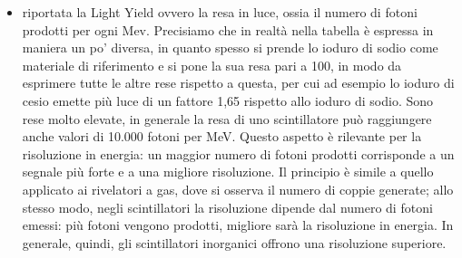 \begin{esempio}
\begin{itemize}[leftmargin=0.5cm]
      \item \E riportata la Light Yield ovvero la resa in luce, ossia il numero di fotoni prodotti per ogni Mev. Precisiamo che in realtà nella tabella è espressa in maniera un po' diversa, in quanto spesso si prende lo ioduro di sodio come materiale di riferimento e si pone la sua resa pari a 100, in modo da esprimere tutte le altre rese rispetto a questa, per cui ad esempio lo ioduro di cesio emette più luce di un fattore 1,65 rispetto allo ioduro di sodio. Sono rese molto elevate, in generale la resa di uno scintillatore può raggiungere anche valori di 10.000 fotoni per MeV. Questo aspetto è rilevante per la risoluzione in energia: un maggior numero di fotoni prodotti corrisponde a un segnale più forte e a una migliore risoluzione. Il principio è simile a quello applicato ai rivelatori a gas, dove si osserva il numero di coppie generate; allo stesso modo, negli scintillatori la risoluzione dipende dal numero di fotoni emessi: più fotoni vengono prodotti, migliore sarà la risoluzione in energia. In generale, quindi, gli scintillatori inorganici offrono una risoluzione superiore.
   \end{itemize}
\end{esempio}

